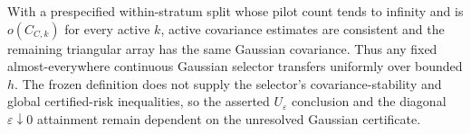 With a prespecified within-stratum split whose pilot count tends to infinity and is \(o(C_{C,k})\) for every active \(k\), active covariance estimates are consistent and the remaining triangular array has the same Gaussian covariance.  Thus any fixed almost-everywhere continuous Gaussian selector transfers uniformly over bounded \(h\).  The frozen definition does not supply the selector's covariance-stability and global certified-risk inequalities, so the asserted \(U_\varepsilon\) conclusion and the diagonal \(\varepsilon\downarrow0\) attainment remain dependent on the unresolved Gaussian certificate.